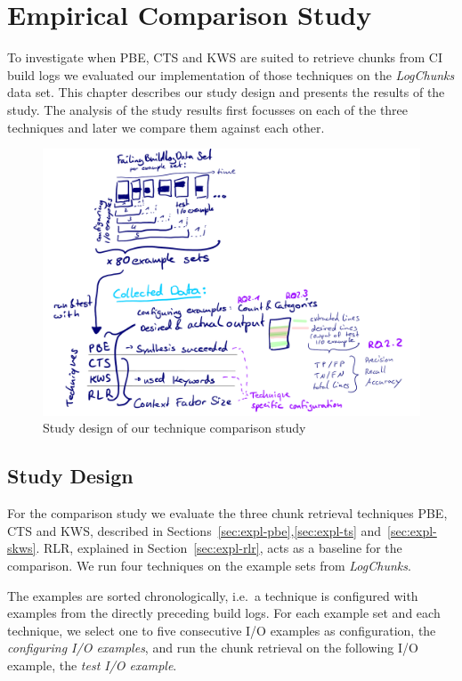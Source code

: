 \documentclass[\myrootdir/main.tex]{subfiles}
\begin{document}
\chapter{Empirical Comparison Study}
\label{sec:study}
To investigate when PBE, CTS and KWS are suited to retrieve chunks from CI build logs we evaluated our implementation of those techniques on the \emph{LogChunks} data set.
This chapter describes our study design and presents the results of the study.
The analysis of the study results first focusses on each of the three techniques and later we compare them against each other.


\begin{figure}[htbp]
	\centering
	\includegraphics[width=\textwidth, clip]{img/study-design.pdf}
	\caption{Study design of our technique comparison study}
	\label{fig:study}
\end{figure}

\section{Study Design}
For the comparison study we evaluate the three chunk retrieval techniques PBE, CTS and KWS, described in Sections~\ref{sec:expl-pbe},\ref{sec:expl-ts} and~\ref{sec:expl-skws}.
RLR, explained in Section~\ref{sec:expl-rlr}, acts as a baseline for the comparison.
We run four techniques on the example sets from \emph{LogChunks}.

The examples are sorted chronologically, i.e.\ a technique is configured with examples from the directly preceding build logs.
For each example set and each technique, we select one to five consecutive I/O examples as configuration, the \emph{configuring I/O examples}, and run the chunk retrieval on the following I/O example, the \emph{test I/O example}.
\end{document}
